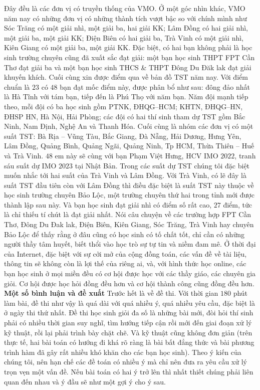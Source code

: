 \begin{multicols}{2}
	Đây đều là các đơn vị có truyền thống của VMO. Ở một góc nhìn khác, VMO năm nay có những đơn vị có những thành tích vượt bậc so với chính mình như Sóc Trăng có một giải nhì, một giải ba, hai giải KK; Lâm Đồng có hai giải nhì, một giải ba, một giải KK; Điện Biên có hai giải ba, Trà Vinh có một giải nhì, Kiên Giang có một giải  ba, một giải KK. Đặc biệt, có hai bạn không phải là học sinh trường chuyên cũng đã xuất sắc đạt giải: một bạn học sinh THPT FPT Cần Thơ đạt giải ba và một bạn học sinh THCS \& THPT Đông Du Đăk lak đạt giải khuyến khích. 
	\vskip 0.05cm
	Cuối cùng xin được điểm qua về bản đồ TST năm nay. Với điểm chuẩn là $23$ có $48$ bạn đạt mốc điểm này, được phân bổ như sau: đông đảo nhất là Hà Tĩnh với tám bạn, tiếp đến là Phú Thọ với năm bạn. Năm đội mạnh tiếp theo, mỗi đội có ba học sinh gồm PTNK, ĐHQG--HCM; KHTN, ĐHQG--HN, ĐHSP HN, Hà Nội, Hải Phòng; các đội có hai thí sinh tham dự TST gồm Bắc Ninh, Nam Định, Nghệ An và Thanh Hóa. Cuối cùng là nhóm các đơn vị có một suất TST: Bà Rịa -- Vũng Tàu, Bắc Giang, Đà Nẵng, Hải Dương, Hưng Yên, Lâm Đồng, Quảng Bình, Quảng Ngãi, Quảng Ninh, Tp HCM, Thừa Thiên -- Huế và Trà Vinh. $48$ em này sẽ cùng với bạn Phạm Việt Hưng, HCV IMO $2022$, tranh sáu suất dự IMO $2023$ tại Nhật Bản. 
	\vskip 0.05cm
	Trong các suất dự TST chúng tôi đặc biệt muốn nhắc tới hai suất của Trà Vinh và Lâm Đồng. Với Trà Vinh, có lẽ đây là suất TST đầu tiên còn với Lâm Đồng thì điều đặc biệt là suất TST này thuộc về học sinh trường chuyên Bảo Lộc, một trường chuyên thứ hai trong tỉnh mới được thành lập sau này. Và bạn học sinh đạt giải nhì có điểm số rất cao, $27$ điểm, tức là chỉ thiếu tí chút là đạt giải nhất.
	\vskip 0.05cm
	Nói câu chuyện về các trường hợp FPT Cần Thơ, Đông Du Đak lak, Điện Biên, Kiên Giang, Sóc Trăng, Trà Vinh hay chuyên Bảo Lộc để thấy rằng ở đâu cũng có học sinh có tố chất tốt, chỉ cần có những người thầy tâm huyết, biết thổi vào học trò sự tự tin và niềm đam mê. Ở thời đại của Internet, đặc biệt với sự cởi mở của cộng đồng toán, các vấn đề về tài liệu, thông tin sẽ không còn là lợi thế của riêng ai, và, với hình thức học online, các bạn học sinh ở mọi miền đều có cơ hội được học với các thầy giáo, các chuyên gia giỏi. Cơ hội được học hỏi đồng đều hơn và cơ hội thành công cũng đồng đều hơn.
	\vskip 0.05cm
	\textbf{\color{cackithi}Một số bình luận và đề xuất}
	\vskip 0.05cm
	Trước hết là về đề thi. Với thời gian $180$ phút làm bài, đề thi như vậy là quá dài với quá nhiều ý, quá nhiều yêu cầu, đặc biệt là ở ngày thi thứ nhất. Đề thi học sinh giỏi đa số là những bài mới, đòi hỏi thí sinh phải có nhiều thời gian suy nghĩ, tìm hướng tiếp cận rồi mới đến giai đoạn xử lý kỹ thuật, rồi lại phải trình bày chặt chẽ. Và kỹ thuật cũng không đơn giản (trên thực tế, hai bài toán có hướng đi khá rõ ràng là bài bất đẳng thức và bài phương trình hàm đã gây rất nhiều khó khăn cho các bạn học sinh). Theo ý kiến của chúng tôi, nên hạn chế các đề toán có nhiều ý mà chỉ nên đưa ra yêu cầu xử lý trọn vẹn một vấn đề. Nếu bài toán có hai ý trở lên thì nhất thiết chúng phải liên quan đến nhau và ý đầu sẽ như một gợi ý cho ý sau.

\end{multicols}
